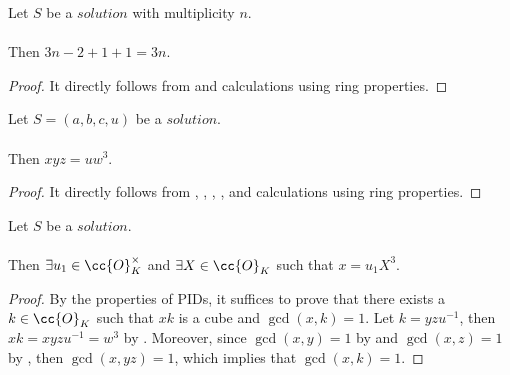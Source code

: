 \begin{lemma}
  \label{lmm:mult_minus_two_plus_one_plus_one}
  \leanok
  Let $S$ be a $solution$ with multiplicity $n$.\\\\
  Then $3n - 2 + 1 + 1 = 3n$.
\end{lemma}
\begin{proof}
  \leanok
  It directly follows from 
  and calculations using ring properties.
\end{proof}

\begin{lemma}
  \label{lmm:x_mul_y_mul_z_eq_u_w_pow_three}
  \leanok
  Let $S=(a,b,c,u)$ be a $solution$.\\\\
  Then $x y z = u w^3$.
\end{lemma}
\begin{proof}
  \leanok
  It directly follows from , ,
  ,
  ,  and
  calculations using ring properties.
\end{proof}

\begin{lemma}
  \label{lmm:x_eq_unit_mul_cube}
  \leanok
  Let $S$ be a $solution$.\\\\
  Then $\exists u_1 \in \cc{O}^\times_K$ and $\exists X \in \cc{O}_K$
  such that $x = u_1 X^3$.
\end{lemma}
\begin{proof}
  \leanok
  By the properties of PIDs, it suffices to prove that there exists a $k\in \cc{O}_K$ such that
  $xk$ is a cube and $\gcd(x,k)=1$.
  Let $k = yzu^{-1}$, then $xk = x y z u^{-1} = w^3$ by .
  Moreover, since $\gcd(x,y)=1$ by  and $\gcd(x,z)=1$ by ,
  then $\gcd(x,yz)=1$, which implies that $\gcd(x,k)=1$.
\end{proof}

